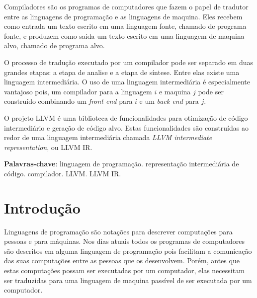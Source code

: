 \documentclass[
  12pt,
  openright,
  twoside,
  a4paper,
  english,
  brazil
]{abntex2}
\begin{document}
\pretextual{}
\hypersetup{pageanchor=false}
\imprimircapa{}
\hypersetup{pageanchor=true}
\imprimirfolhaderosto{}

\begin{folhadeaprovacao}
  
\end{folhadeaprovacao}

\begin{resumo}
Compiladores são os programas de computadores que fazem o papel de tradutor entre as linguagens de programação e as linguagens de maquina.
Eles recebem como entrada um texto escrito em uma linguagem fonte, chamado de programa fonte, e produzem como saída um texto escrito em uma linguagem de maquina alvo, chamado de programa alvo.

O processo de tradução executado por um compilador pode ser separado em duas grandes etapas: a etapa de analise e a etapa de síntese.
Entre elas existe uma linguagem intermediária.
O uso de uma linguagem intermediária é especialmente vantajoso pois, um compilador para a linguagem $i$ e maquina $j$ pode ser construído combinando um \textit{front end} para $i$ e um \textit{back end} para $j$.

O projeto LLVM é uma biblioteca de funcionalidades para otimização de código intermediário e geração de código alvo.
Estas funcionalidades são construídas ao redor de uma linguagem intermediária chamada \textit{LLVM intermediate representation}, ou LLVM IR\@.

\vspace{\onelineskip}
\noindent
\textbf{Palavras-chave}: linguagem de programação\@. representação intermediária de código\@. compilador\@. LLVM\@. LLVM IR\@.

\end{resumo}

\begin{KeepFromToc}
  \tableofcontents
\end{KeepFromToc}

\textual{}

\chapter{Introdução}\label{cap:introducao}

Linguagens de programação são notações para descrever computações para pessoas e para máquinas.
Nos dias atuais todos os programas de computadores são descritos em alguma linguagem de programação
pois facilitam a comunicação das suas computações entre as pessoas que os desenvolvem.
Porém, antes que estas computações possam ser executadas por um computador,
elas necessitam ser traduzidas para uma linguagem de maquina passível de ser executada por um computador.
\end{document}
